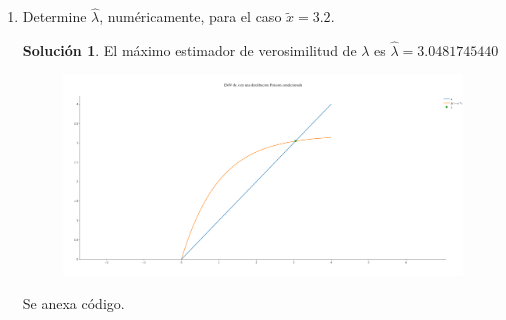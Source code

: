 \documentclass[letterpaper]{article}
\theoremstyle{definition}
\theoremstyle{lemathm}
\theoremstyle{lemathm}
\newtheorem{sol}{Solución}
\theoremstyle{lemathm}
\theoremstyle{lemademthm}
\newcommand{\pars}[1]{\left( #1 \right) }
\newcommand{\bracs}[1]{\left[ #1 \right] }
\newcommand{\PP}{\mathbb{P}}
\newcommand{\1}{\mathbbm{1}}
\begin{document}
\begin{enumerate}
\begin{proof}
			\[L\pars{\lambda} = \prod_{i=1}^n \PP\bracs{Y_{i} = y_{i}} = \prod_{i=1}^n \frac{\lambda^{y_{i}}e^{-\lambda}}{y_{i}! \pars{1-e^{-\lambda}}} = \pars{\frac{\pars{\lambda^{\overline{y}}}e^{-\lambda }}{\pars{1-e^{-\lambda}}}}^n \prod_{i=1}^n \frac{1}{y_{i}!},\]

			por lo que la logverosimilitud haciendo uso de propiedades del logaritmo es

			\[l\pars{\lambda} = \log\pars{\pars{\frac{\pars{\lambda^{\overline{y}}}e^{-\lambda }}{\pars{1-e^{-\lambda}}}}^n \prod_{i=1}^n \frac{1}{y_{i}!}} = n\overline{y}\log\pars{\lambda} - n\lambda - n\log\pars{1-e^{-\lambda}} + \sum_{i=1}^n\log\pars{\frac{1}{y_{i}!}}\]

			con $\overline{y} = \sum_{i} y_i/n$, de donde obtenemos la función score haciendo uso de propiedades de la derivada es

			\[S\pars{\lambda} = \diff{n\overline{y}\log\pars{\lambda} - n\lambda - n\log\pars{1-e^{-\lambda}} + \sum_{i=1}^n\log\pars{\frac{1}{y_{i}!}}}{\lambda} = \frac{n\overline{y}}{\lambda} - n - \frac{ne^{-\lambda}}{1-e^{-\lambda}},\]

			por lo tanto el emv de $\lambda$ es

			\[\hat{\lambda} = \overline{y} \pars{1-e^{-\lambda}}.\]

			Debido a que $\tilde{x} = \sum_{i} ix_{i}/n = \sum_{i} y_i/n = \overline{y},$ concluimos que

			\[\hat{\lambda} = \tilde{x} \pars{1-e^{-\lambda}}.\]
		\end{proof}
		\item Determine $\hat{\lambda}$, numéricamente, para el caso $\tilde{x} = 3.2$.
		
		\begin{sol}
			El máximo estimador de verosimilitud de $\lambda$ es $\hat{\lambda} = 3.0481745440$

			\begin{figure}[H]
				\begin{center}
					\includegraphics[scale=0.22]{Images/emv.png}
				\end{center}
			\end{figure}

			Se anexa código.
		\end{sol}
	\end{enumerate}
\end{document}
